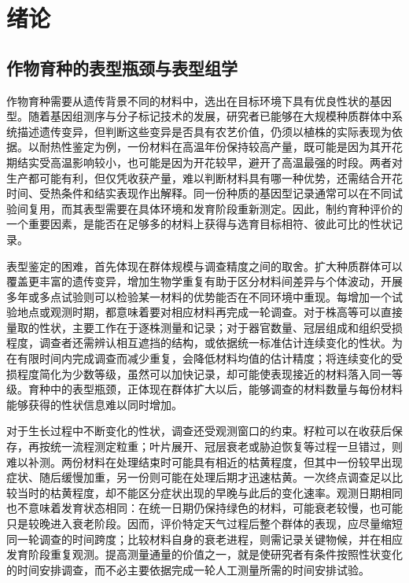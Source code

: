 \section{绪论}
\label{sec:introduction}

\subsection{作物育种的表型瓶颈与表型组学}
\label{sec:research-background}

作物育种需要从遗传背景不同的材料中，选出在目标环境下具有优良性状的基因型。随着基因组测序与分子标记技术的发展，研究者已能够在大规模种质群体中系统描述遗传变异，但判断这些变异是否具有农艺价值，仍须以植株的实际表现为依据。以耐热性鉴定为例，一份材料在高温年份保持较高产量，既可能是因为其开花期结实受高温影响较小，也可能是因为开花较早，避开了高温最强的时段。两者对生产都可能有利，但仅凭收获产量，难以判断材料具有哪一种优势，还需结合开花时间、受热条件和结实表现作出解释。同一份种质的基因型记录通常可以在不同试验间复用，而其表型需要在具体环境和发育阶段重新测定。因此，制约育种评价的一个重要因素，是能否在足够多的材料上获得与选育目标相符、彼此可比的性状记录。

表型鉴定的困难，首先体现在群体规模与调查精度之间的取舍。扩大种质群体可以覆盖更丰富的遗传变异，增加生物学重复有助于区分材料间差异与个体波动，开展多年或多点试验则可以检验某一材料的优势能否在不同环境中重现。每增加一个试验地点或观测时期，都意味着要对相应材料再完成一轮调查。对于株高等可以直接量取的性状，主要工作在于逐株测量和记录；对于器官数量、冠层组成和组织受损程度，调查者还需辨认相互遮挡的结构，或依据统一标准估计连续变化的性状。为在有限时间内完成调查而减少重复，会降低材料均值的估计精度；将连续变化的受损程度简化为少数等级，虽然可以加快记录，却可能使表现接近的材料落入同一等级。育种中的表型瓶颈，正体现在群体扩大以后，能够调查的材料数量与每份材料能够获得的性状信息难以同时增加。

对于生长过程中不断变化的性状，调查还受观测窗口的约束。籽粒可以在收获后保存，再按统一流程测定粒重；叶片展开、冠层衰老或胁迫恢复等过程一旦错过，则难以补测。两份材料在处理结束时可能具有相近的枯黄程度，但其中一份较早出现症状、随后缓慢加重，另一份则可能在处理后期才迅速枯黄。一次终点调查足以比较当时的枯黄程度，却不能区分症状出现的早晚与此后的变化速率。观测日期相同也不意味着发育状态相同：在统一日期仍保持绿色的材料，可能衰老较慢，也可能只是较晚进入衰老阶段。因而，评价特定天气过程后整个群体的表现，应尽量缩短同一轮调查的时间跨度；比较材料自身的衰老进程，则需记录关键物候，并在相应发育阶段重复观测。提高测量通量的价值之一，就是使研究者有条件按照性状变化的时间安排调查，而不必主要依据完成一轮人工测量所需的时间安排试验。

